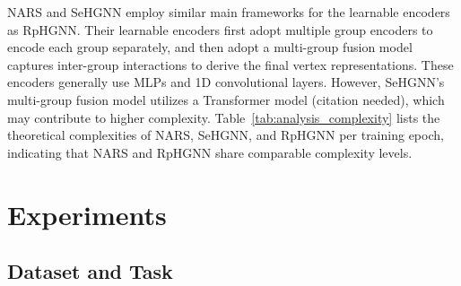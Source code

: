 \documentclass[lettersize,journal]{IEEEtran}
\begin{document}
NARS and SeHGNN employ similar main frameworks for the learnable encoders as RpHGNN.
Their learnable encoders first adopt multiple group encoders to encode each group separately, and then adopt  a multi-group fusion model captures inter-group interactions to derive the final vertex representations.
These encoders generally use MLPs and 1D convolutional layers. 
However, SeHGNN's multi-group fusion model utilizes a Transformer model (citation needed), which may contribute to higher complexity.
Table~\ref{tab:analysis_complexity} lists the theoretical complexities of NARS, SeHGNN, and RpHGNN per training epoch, indicating that NARS and RpHGNN share comparable complexity levels.














\begin{table}[!tp]
\vspace{-2mm}
\centering
\caption{
Theoretical complexity of NARS, SeHGNN, and RpHGNN in every  training epoch.
$N$ is the number of target vertices.
For simplicity, we use the same $D$ as the dimensionality of input features and hidden representations of MLPs.
For NARS, $S$ is the number of sampled relation subsets.
For SeHGNN, $M$ is the number of relations (meta-path schemas) used.
For RpHGNN, $R$ is the number of relations that end with the target vertex type.
}
\label{tab:analysis_complexity}
\end{table}



\section{Experiments}




\subsection{Dataset and Task}
\end{document}
